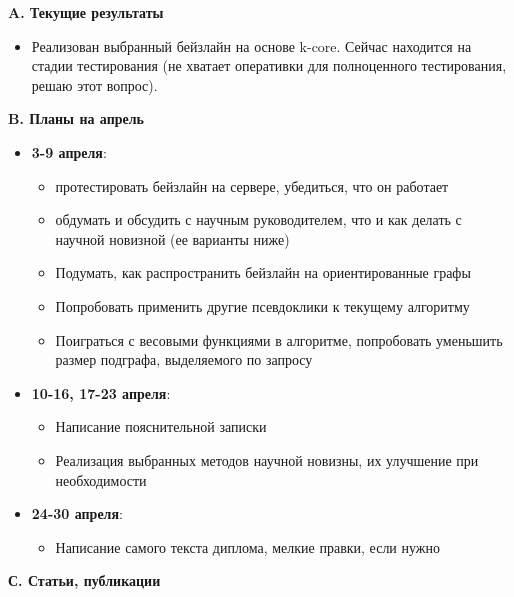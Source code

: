 \documentclass[11pt,a4paper,oneside]{article}
\begin{document}
\renewcommand{\t}[1]{\mbox{\texttt{#1}}}
\newcommand{\s}[1]{\mbox{``\t{#1}''}}
\newcommand{\eps}{\varepsilon}
\renewcommand{\phi}{\varphi}
\newcommand{\plainhat}{{\char 94}}

\newcommand{\Z}{\mathbb{Z}}
\newcommand{\w}[1]{``\t{#1}''}





\textbf{A. Текущие результаты}

\begin{itemize}
\item Реализован выбранный бейзлайн на основе k-core. Сейчас находится на стадии тестирования (не хватает оперативки для полноценного тестирования, решаю этот вопрос).
\end{itemize}

\textbf{B. Планы на апрель}

\begin{itemize}
  \item \textbf{3-9 апреля}: 
    \begin{itemize} 
      \item протестировать бейзлайн на сервере, убедиться, что он работает
      \item обдумать и обсудить с научным руководителем, что и как делать с научной новизной (ее варианты ниже)
      \item Подумать, как распространить бейзлайн на ориентированные графы
      \item Попробовать применить другие псевдоклики к текущему алгоритму
      \item Поиграться с весовыми функциями в алгоритме, попробовать уменьшить размер подграфа, выделяемого по запросу
    \end{itemize}
  \item \textbf{10-16, 17-23 апреля}:
    \begin{itemize}
      \item Написание пояснительной записки
      \item Реализация выбранных методов научной новизны, их улучшение при необходимости
    \end{itemize}
  \item \textbf{24-30 апреля}:
    \begin{itemize}
      \item Написание самого текста диплома, мелкие правки, если нужно
    \end{itemize}
\end{itemize}

\textbf{С. Статьи, публикации}

\frownie{}
\end{document}
